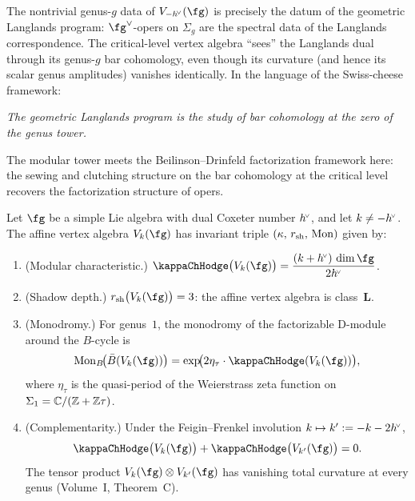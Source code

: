 \begin{remark}
\label{rem:critical-level-langlands}
The nontrivial genus-$g$ data of $V_{-\hvee}(\fg)$ is precisely
the datum of the geometric Langlands program:
$\fg^\vee$-opers on $\Sigma_g$ are the spectral data of the
Langlands correspondence. The critical-level vertex algebra
``sees'' the Langlands dual through its genus-$g$ bar cohomology,
even though its curvature (and hence its scalar genus amplitudes)
vanishes identically. In the language of the Swiss-cheese
framework:
\begin{center}
\emph{The geometric Langlands program is the study of bar
cohomology at the zero of the genus tower.}
\end{center}
The modular tower meets the Beilinson--Drinfeld factorization
framework here: the sewing and clutching structure on the bar
cohomology at the critical level recovers the factorization
structure of opers.
\end{remark}

\begin{theorem}
\label{thm:classification-affine-monodromy}
Let\/ $\fg$ be a simple Lie algebra with dual Coxeter number\/
$h^{\!\scriptscriptstyle\vee}$, and let $k \neq -h^{\!\scriptscriptstyle\vee}$. The affine vertex algebra
$V_k(\fg)$ has invariant triple
$(\kappa,\, r_{\mathrm{sh}},\, \operatorname{Mon})$ given by:
\begin{enumerate}[label=\textup{(\roman*)}]
\item \textup{(Modular characteristic.)}
 $\displaystyle\kappaChHodge\bigl(V_k(\fg)\bigr)
 = \frac{(k + \hvee)\,\dim \fg}{2\hvee}$.
\item \textup{(Shadow depth.)}
 $\dalg\bigl(V_k(\fg)\bigr) = 3$: the affine vertex algebra
 is class~$\mathbf L$.
\item \textup{(Monodromy.)}
 For genus~$1$, the monodromy of the factorizable D-module
 around the $B$-cycle is
 \[
 \operatorname{Mon}_{B}\!\bigl(\barB(V_k(\fg))\bigr)
 = \exp\!\bigl(2\eta_\tau \cdot \kappaChHodge(V_k(\fg))\bigr),
 \]
 where $\eta_\tau$ is the quasi-period of the Weierstrass zeta
 function on $\Sigma_1 = \mathbb{C}/(\mathbb{Z}+\mathbb{Z}\tau)$.
\item \textup{(Complementarity.)}
 Under the Feigin--Frenkel involution
 $k \mapsto k' := -k - 2h^{\!\scriptscriptstyle\vee}$,
 \[
 \kappaChHodge\bigl(V_k(\fg)\bigr)
 + \kappaChHodge\bigl(V_{k'}(\fg)\bigr) = 0.
 \]
 The tensor product $V_k(\fg) \otimes V_{k'}(\fg)$ has vanishing
 total curvature at every genus
 \textup{(}Volume~I, Theorem~C\textup{)}.
\end{enumerate}
\end{theorem}

